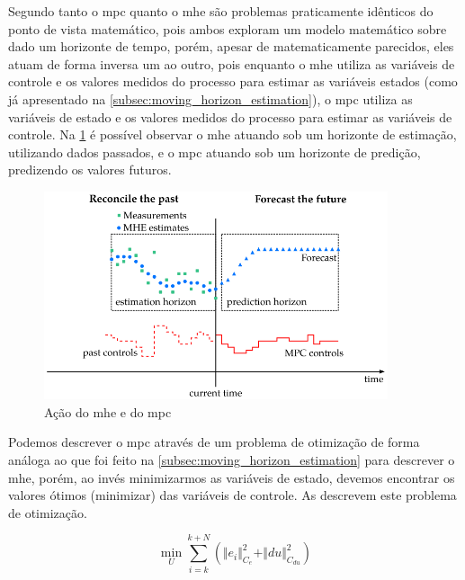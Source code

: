 Segundo  tanto o \acrshort{mpc} quanto o \acrshort{mhe} são problemas praticamente
idênticos do ponto de vista matemático, pois ambos exploram um modelo matemático sobre dado um horizonte de
tempo, porém, apesar de matematicamente parecidos, eles atuam de forma inversa um ao outro, pois
enquanto o \acrshort{mhe} utiliza as variáveis de controle e os valores medidos do processo para estimar
as variáveis estados (como já apresentado na \cref{subsec:moving_horizon_estimation}), o \acrshort{mpc}
utiliza as variáveis de estado e os valores medidos do processo para estimar as variáveis de controle.
Na \cref{fig:mhe_mpc} é possível observar o \acrshort{mhe} atuando sob um horizonte de estimação, utilizando
dados passados, e o \acrshort{mpc} atuando sob um horizonte de predição, predizendo os valores futuros.

\begin{figure}
	\begin{center}
		\includegraphics[width=0.9\textwidth]{./5_images/fig_mhe_mpc.png} 
		\caption{Ação do \acrlong{mhe} e do \acrlong{mpc}}
		\label{fig:mhe_mpc}
	\end{center}
\end{figure}

Podemos descrever o \acrshort{mpc} através de um problema de otimização de forma análoga ao que foi feito
na \cref{subsec:moving_horizon_estimation} para descrever o \acrshort{mhe}, porém, ao invés minimizarmos
as variáveis de estado, devemos encontrar os valores ótimos (minimizar) das variáveis de controle.
As  descrevem este problema de otimização.

\begin{equation}
	\label{eq:mpc_minimization}
	\min_{U} \sum_{i=k}^{k+N} ( \Vert e_i \Vert^2_{C_e} + \Vert du \Vert^2_{C_{du}} )
\end{equation}

